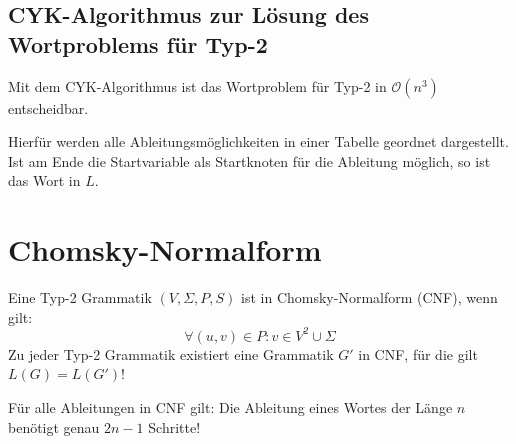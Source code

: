 \subsection{CYK-Algorithmus zur Lösung des Wortproblems für Typ-2}\label{algo:cyk}
Mit dem CYK-Algorithmus ist das Wortproblem für Typ-2 in $\mathcal O(n^3)$ entscheidbar.

Hierfür werden alle Ableitungsmöglichkeiten in einer Tabelle geordnet dargestellt. Ist am Ende die Startvariable als Startknoten für die Ableitung möglich, so ist das Wort in $L$.


\section{Chomsky-Normalform}
Eine Typ-2 Grammatik $(V,\Sigma,P,S)$ ist in Chomsky-Normalform (CNF),  wenn gilt:
\begin{equation*}
	\forall (u,v)\in P: v\in V^2\cup \Sigma
\end{equation*}
Zu jeder Typ-2 Grammatik existiert eine Grammatik $G'$ in CNF, für die gilt $L(G)=L(G')$!

Für alle Ableitungen in CNF gilt: Die Ableitung eines Wortes der Länge $n$ benötigt genau $2n-1$ Schritte!
